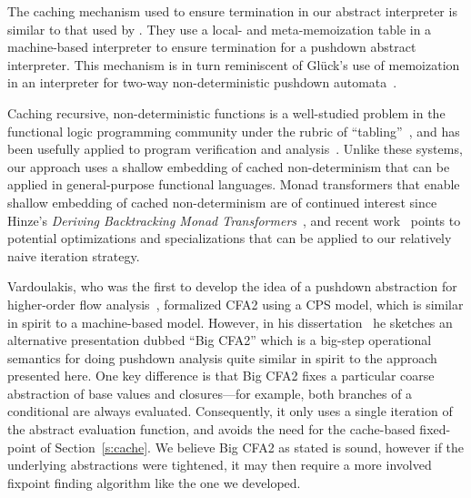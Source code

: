 The caching mechanism used to ensure termination in our abstract interpreter is
similar to that used by \citet{dvanhorn:Johnson2014Abstracting}. They use a local- and
meta-memoization table in a machine-based interpreter to ensure termination for
a pushdown abstract interpreter.  This mechanism is in turn reminiscent of
Gl\"{u}ck's use of memoization in an interpreter for two-way non-deterministic
pushdown automata~\cite{local:gluck-schmidtfest13}.

Caching recursive, non-deterministic functions is a well-studied
problem in the functional logic programming community under the rubric
of ``tabling''~\cite{local:tamaki1986old, local:bol1993tabulated,
  local:chen1996tabled, local:swift2012xsb}, and has been usefully
applied to program verification and
analysis~\cite{local:dawson1996practical,
  local:janssens1998use}. Unlike these systems, our approach uses a
shallow embedding of cached non-determinism that can be applied in
general-purpose functional languages.
%
Monad transformers that enable shallow embedding of cached non-determinism are
of continued interest since Hinze's \emph{Deriving Backtracking Monad
  Transformers}~\cite{local:hinze2000deriving, local:kiselyov2005backtracking,
  local:fischer2011purely}, and recent work~\cite{local:ploeg2014reflection,
  local:vandenbroucke2016fixing} points to potential optimizations and
specializations that can be applied to our relatively naive iteration strategy.

Vardoulakis, who was the first to develop the idea of a pushdown abstraction
for higher-order flow analysis~\cite{dvanhorn:Vardoulakis2011CFA2}, formalized
CFA2 using a CPS model, which is similar in spirit to a machine-based model.
However, in his dissertation~\cite{local:vardoulakis-diss12} he sketches an
alternative presentation dubbed ``Big CFA2'' which is a big-step operational
semantics for doing pushdown analysis quite similar in spirit to the approach
presented here.  One key difference is that Big CFA2 fixes a particular coarse
abstraction of base values and closures---for example, both branches of a
conditional are always evaluated.  Consequently, it only uses a single
iteration of the abstract evaluation function, and avoids the need for the
cache-based fixed-point of Section~\ref{s:cache}.  We believe Big CFA2 as
stated is sound, however if the underlying abstractions were tightened, it
may then require a more involved fixpoint finding algorithm like the one we
developed.

